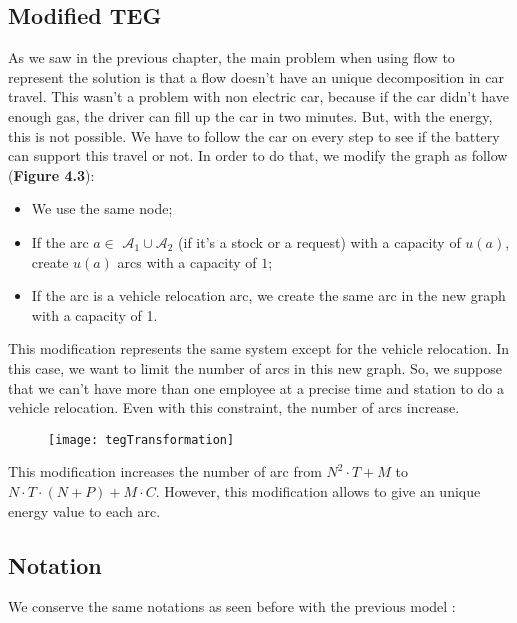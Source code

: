 \begin{bibunit}[ieeetr]
\subsection{Modified TEG}
As we saw in the previous chapter, the main problem when using flow to represent the solution is that a flow doesn't have an unique decomposition in car travel.
This wasn't a problem with non electric car, because if the car didn't have enough gas, the driver can fill up the car in two minutes.
But, with the energy, this is not possible.
We have to follow the car on every step to see if the battery can support this travel or not. 
In order to do that, we modify the graph as follow (\textbf{Figure 4.3}):
\begin{itemize}
\item
We use the same node;
\item
If the arc $a \in$ $\mathcal{A}_1 \cup \mathcal{A}_2$ (if it's a stock or a request) with  a capacity of  $u(a)$, create $u(a)$ arcs with a capacity of $1$;
\item
If the arc is a vehicle relocation arc, we create the same arc in the new graph with a capacity of 1.
\end{itemize}
This modification represents the same system except for the vehicle relocation. In this case, we want to limit the number of arcs in this new graph. So, we suppose that we can't have more than one employee at a precise time and station to do a vehicle relocation. Even with this constraint, the number of arcs increase.

\begin{figure}[!h]
\texttt{[image: tegTransformation]}
\end{figure}

This modification increases the number of arc from $ N^2 \cdot T + M$ to $ N \cdot T \cdot (N+P) + M \cdot C$.
However, this modification allows to give an unique energy value to each arc.

\subsection{Notation}
We conserve the same notations as seen before with the previous model :


\end{bibunit}

